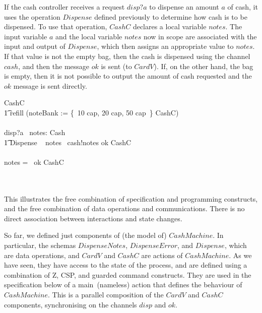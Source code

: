 \documentclass{article}
\begin{document}
If the cash controller receives a request $disp?a$ to dispense an
amount $a$ of cash, it uses the operation $Dispense$ defined
previously to determine how cash is to be dispensed.  To use that
operation, $CashC$ declares a local variable $notes$. The input
variable $a$ and the local variable $notes$ now in scope are
associated with the input and output of $Dispense$, which then
assigns an appropriate value to $notes$. If that value is not the
empty bag, then the cash is dispensed using the channel $cash$, and
then the message $ok$ is sent (to $CardV$). If, on the other hand,
the bag is empty, then it is not possible to output the amount of
cash requested and the $ok$ message is sent directly.
\begin{circusaction}
  CashC \circdef
  \\ \t1
  \circblockbegin
      refill \then (noteBank := \{~10 \mapsto cap, 20 \mapsto cap, 50 \mapsto cap~\} \circseq CashC)
      \\ %
      \extchoice
      \\ %
      disp?a \then
        \circblockbegin   %
            \circvar\ notes: Cash \circspot
                \\ \t1 %
                \circblockbegin
                     \lschexpract Dispense \rschexpract \circseq~{}
                     \also
                     \circblockbegin
                        \lcircguard
                         notes \neq \lbag\rbag
                         \rcircguard
                            \circguard\ cash!notes \then ok \then CashC
                         \\ %
                         \extchoice
                         \\ %
                         \lcircguard notes = \lbag\rbag \rcircguard
                             \circguard\ ok \then CashC
                     \circblockend \\
                \circblockend \\
        \circblockend \\
   \circblockend
\end{circusaction}
This illustrates the free combination of specification and
programming constructs, and the free combination of data operations
and communications. There is no direct association between
interactions and state changes.

So far, we defined just components of (the model of) $CashMachine$.
In particular, the schemas $DispenseNotes$, $DispenseError$, and
$Dispense$, which are data operations, and $CardV$ and $CashC$ are
actions of $CashMachine$.  As we have seen, they have access to the
state of the process, and are defined using a combination of Z, CSP,
and guarded command constructs.  They are used in the specification
below of a main~(nameless) action that defines the behaviour of
$CashMachine$. This is a parallel composition of the $CardV$ and
$CashC$ components, synchronising on the channels $disp$ and $ok$.
\end{document}
